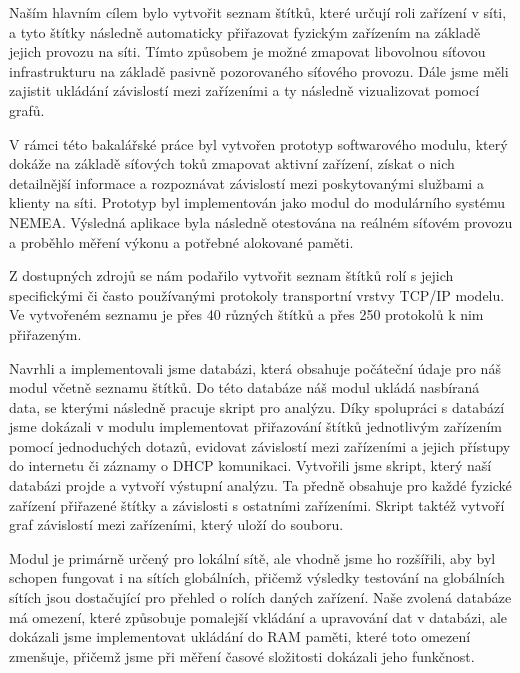 \documentclass[thesis=B,czech,hidelinks]{FITthesis}[2019/03/21]
\begin{document}


\begin{conclusion}
	Naším hlavním cílem bylo vytvořit seznam štítků, které určují roli zařízení v síti, a tyto štítky následně automaticky přiřazovat fyzickým zařízením na základě jejich provozu na síti. Tímto způsobem je možné zmapovat libovolnou síťovou infrastrukturu na základě pasivně pozorovaného síťového provozu. Dále jsme měli zajistit ukládání závislostí mezi zařízeními a ty následně vizualizovat pomocí grafů. 
	
	V rámci této bakalářské práce byl vytvořen prototyp softwarového modulu, který dokáže na základě síťových toků zmapovat aktivní zařízení, získat o nich detailnější informace a  rozpoznávat závislostí mezi poskytovanými službami a klienty na síti. Prototyp byl implementován jako modul do modulárního systému NEMEA. Výsledná aplikace byla následně otestována na reálném síťovém provozu a proběhlo měření výkonu a potřebné alokované paměti.
	
	Z dostupných zdrojů se nám podařilo vytvořit seznam štítků rolí s jejich specifickými či často používanými protokoly transportní vrstvy TCP/IP modelu. Ve vytvořeném seznamu je přes 40 různých štítků a přes 250 protokolů k nim přiřazeným.
	
	Navrhli a implementovali jsme databázi, která obsahuje počáteční údaje pro náš modul včetně seznamu štítků. Do této databáze náš modul ukládá nasbíraná data, se kterými následně pracuje skript pro analýzu. Díky spolupráci s databází jsme dokázali v modulu implementovat přiřazování štítků jednotlivým zařízením pomocí jednoduchých dotazů, evidovat závislostí mezi zařízeními a jejich přístupy do internetu či záznamy o DHCP komunikaci. Vytvořili jsme skript, který naší databázi projde a vytvoří výstupní analýzu. Ta předně obsahuje pro každé fyzické zařízení přiřazené štítky a závislosti s ostatními zařízeními. Skript taktéž vytvoří graf závislostí mezi zařízeními, který uloží do souboru. 
	
	Modul je primárně určený pro lokální sítě, ale vhodně jsme ho rozšířili, aby byl schopen fungovat i na sítích globálních, přičemž výsledky testování na globálních sítích jsou dostačující pro přehled o rolích daných zařízení. Naše zvolená databáze má omezení, které způsobuje pomalejší vkládání a upravování dat v databázi, ale dokázali jsme implementovat ukládání do RAM paměti, které toto omezení zmenšuje, přičemž jsme při měření časové složitosti dokázali jeho funkčnost.
	

\end{conclusion}
\end{document}
